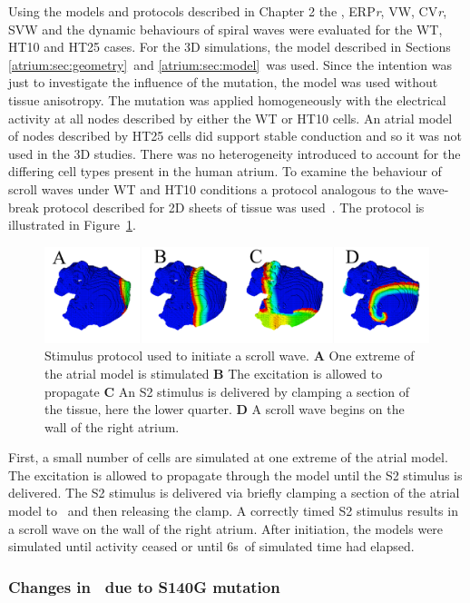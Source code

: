Using the models and protocols described in Chapter 2 the \apdr, ERP\emph{r}, VW,
CV\emph{r}, SVW and the dynamic behaviours of spiral waves were evaluated for
the WT, HT10 and HT25 cases.
For the 3D simulations, the model described in Sections
\ref{atrium:sec:geometry}\ and \ref{atrium:sec:model}\ was used.
Since the intention was just to investigate the influence of the mutation, the
model was used without tissue anisotropy.
The mutation was applied homogeneously with the electrical activity at all
nodes described by either the WT or HT10 cells.
An atrial model of nodes described by HT25 cells did support stable conduction
and so it was not used in the 3D studies.
There was no heterogeneity introduced to account for the differing cell types
present in the human atrium.
To examine the behaviour of scroll waves under WT and HT10 conditions a protocol
analogous to the wave-break protocol described for 2D sheets of tissue was
used~\cite{Kharche2007}.
The protocol is illustrated in Figure~\ref{atrium:iks:scroll_init}.
\begin{figure}
\includegraphics{figures/atrium/iks/scrollhowto}
\caption[Initiating a Scroll Wave]{
\label{atrium:iks:scroll_init}
Stimulus protocol used to initiate a scroll wave.
\textbf{A} One extreme of the atrial model is stimulated
\textbf{B} The excitation is allowed to propagate
\textbf{C} An S2 stimulus is delivered by clamping a section of the tissue, here
the lower quarter.
\textbf{D} A scroll wave begins on the wall of the right atrium.
}
\end{figure}
First, a small number of cells are simulated at one extreme of the atrial model.
The excitation is allowed to propagate through the model until the S2 stimulus
is delivered.
The S2 stimulus is delivered via briefly clamping a section of the atrial model to
\ and then releasing the clamp.
A correctly timed S2 stimulus results in a scroll wave on the wall of the right
atrium.
After initiation, the models were simulated until activity ceased or until
\unit{6}{s}\ of simulated time had elapsed.

\subsubsection{Changes in \apd\ due to S140G mutation}

